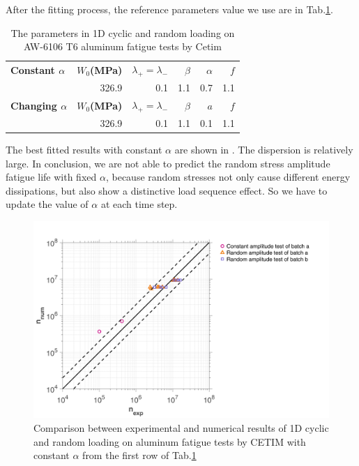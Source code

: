 After the fitting process, the reference parameters value we use are in Tab.\ref{tab.cetim.alp}.
\begin{table}[!h]
\centering
\begin{tabular}{lrrrrr}
\hline
\textbf{Constant $\alpha$} & \textbf{$W_0$(MPa)} & \textbf{$\lambda_+=\lambda_-$} & \textbf{$\beta$}  & \textbf{$\alpha$}& \textbf{$f$}\\
& 326.9         & 0.1               & 1.1            & 0.7      & 1.1                    \\ \hline
\textbf{Changing $\alpha$} & \textbf{$W_0$(MPa)} & \textbf{$\lambda_+=\lambda_-$} & \textbf{$\beta$}  & \textbf{$a$} & \textbf{$f$}\\
& 326.9         & 0.1               & 1.1            & 0.1         & 1.1                \\ \hline
\end{tabular}
\caption{The parameters in 1D cyclic and random loading on AW-6106 T6
aluminum fatigue tests by Cetim}
\label{tab.cetim.alp}
\end{table}

The best fitted results with constant $\alpha$ are shown in . The dispersion is relatively large. In conclusion, we are not able to predict the random stress amplitude fatigue life with fixed $\alpha$, because random stresses not only cause different energy dissipations, but also show a distinctive load sequence effect. So we have to update the value of $\alpha$ at each time step. 

\begin{figure}[!h]
\centering
\includegraphics[width=\textwidth]{figures//Cetim_err_alpfix.png} 
\caption{Comparison between experimental and numerical results of 1D cyclic and random loading on aluminum fatigue tests by CETIM with constant $\alpha$ from the first row of Tab.\ref{tab.cetim.alp}}
\label{fig.Cetimerralpfix}
\end{figure}

